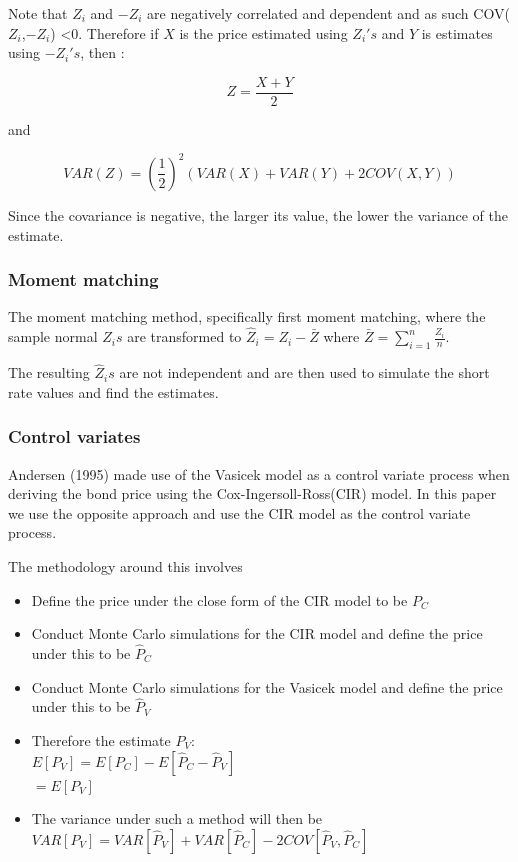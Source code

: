 \documentclass[12pt,a4paper]{article}
\begin{document}
Note that $Z_{i}$ and $-Z_{i}$ are negatively correlated and dependent and as such COV( $Z_{i}$,$-Z_{i}$) <0. Therefore if $X$ is the price estimated using $Z_i's$ and $Y$ is estimates using $-Z_i's$, then :

$$Z =\frac{X+Y}{2}$$

and 

$$VAR(Z)=(\frac{1}{2})^{2}(VAR(X)+VAR(Y)+2COV(X,Y))$$

Since the covariance is negative, the larger its value, the lower the variance of the estimate.

\subsubsection{Moment matching}
The moment matching method, specifically first moment matching, where the sample normal $Z_{i}s$ are transformed to $\hat{Z}_{i}=Z_{i}-\bar{Z}$ where $\bar{Z}=\sum_{i=1}^{n}\frac{Z_{i}}{n}$.

The resulting $\hat{Z}_{i}s$ are not independent and are then used to simulate the short rate values and find the estimates.   



\subsubsection{Control variates}
Andersen (1995) made use of the Vasicek model as a control variate process when deriving the bond price using the Cox-Ingersoll-Ross(CIR) model. In this paper we use the opposite approach and use the CIR model as the control variate process.

The methodology around this involves

\begin{itemize}
	
	\item Define the price under the close form of the CIR model to be $P_{C}$
	\item Conduct Monte Carlo simulations for the CIR model and define the price under this to be $\hat{P}_{C}$
	\item Conduct Monte Carlo simulations for the Vasicek model and define the price under this to be $\hat{P}_{V}$
	\item Therefore the estimate $P_{V}$:
	\\$E[P_{V}]=E[P_{C}]-E[\hat{P}_{C}-\hat{P}_{V}]$
	\\ $= E[P_{V}]$
	\item The variance under such a method will then be 
	\\$VAR[P_{V}]=VAR[\hat{P}_{V}]+VAR[\hat{P}_{C}]-2COV[\hat{P}_{V},\hat{P}_{C}]$
	
\end{itemize}
\end{document}
